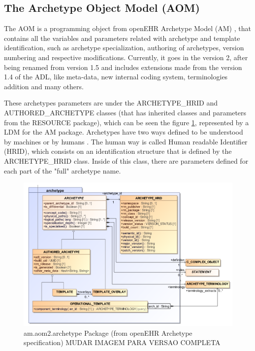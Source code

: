 \documentclass[mim_thesis.tex]{subfiles}
\begin{document}
\subsection{The Archetype Object Model (AOM)}
The AOM is a programming object from openEHR Archetype Model (AM) \citep{openEHRAOM}, that contains all the variables and parameters related with  archetype and template identification, such as archetype specialization, authoring of archetypes, version numbering and respective modifications. Currently, it goes in the version 2, after being renamed from version 1.5 and includes extensions made from the version 1.4 of the ADL, like meta-data, new internal coding system, terminologies addition and many others. \par 
These archetypes parameters are under the ARCHETYPE\_HRID and AUTHORED\_ARCHETYPE classes (that has inherited classes and parameters from the RESOURCE package), which can be seen the figure \ref{fig:RM_archtype}, represented by a \ac{LDM} for the AM package. Archetypes have two ways defined to be understood by machines or by humans \citep{openEHRarchver}. The human way is called Human readable Identifier (HRID), which consists on an identification structure that is defined by the ARCHETYPE\_HRID class. Inside of this class, there are parameters defined for each part of the "full" archetype name.

\begin{figure}[H]
	\centering
    \includegraphics[width=1\textwidth]{img/RM_archtype.PNG}
	\caption{am.aom2.archetype Package (from openEHR Archetype specification) MUDAR IMAGEM PARA VERSAO COMPLETA}
	\label{fig:RM_archtype}
\end{figure}
\end{document}
